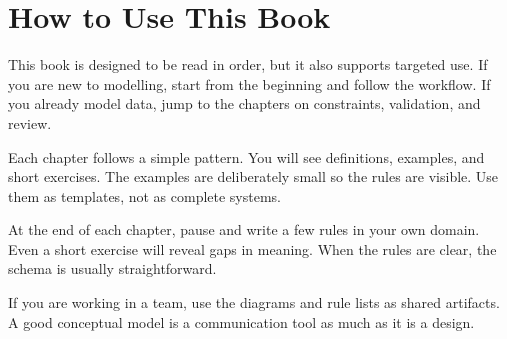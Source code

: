 \chapter*{How to Use This Book}

This book is designed to be read in order, but it also supports targeted use.
If you are new to modelling, start from the beginning and follow the workflow.
If you already model data, jump to the chapters on constraints, validation, and review.

Each chapter follows a simple pattern.
You will see definitions, examples, and short exercises.
The examples are deliberately small so the rules are visible.
Use them as templates, not as complete systems.

At the end of each chapter, pause and write a few rules in your own domain.
Even a short exercise will reveal gaps in meaning.
When the rules are clear, the schema is usually straightforward.

If you are working in a team, use the diagrams and rule lists as shared artifacts.
A good conceptual model is a communication tool as much as it is a design.
